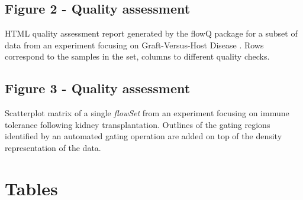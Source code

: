 \documentclass[10pt]{bmc_article}
\newcommand{\Rclass}[1]{{\textit{#1}}}
\newenvironment{bmcformat}{\begin{raggedright}\baselineskip20pt\sloppy\setboolean{publ}{false}}{\end{raggedright}\baselineskip20pt\sloppy}
\begin{document}
\begin{bmcformat}
  
  \subsection*{Figure 2 - Quality assessment}
    \label{flowQ}%
        HTML quality assessment report generated by the flowQ package for a
        subset of data from an experiment focusing on Graft-Versus-Host
        Disease \cite{brinkman2007hcf}. Rows correspond to the samples in
        the set, columns to different quality checks.


    \subsection*{Figure 3 - Quality assessment}
    \label{xyplot}{
        Scatterplot matrix of a single \Rclass{flowSet} from an experiment
        focusing on immune tolerance following kidney
        transplantation. Outlines of the gating regions identified by an
        automated gating operation are added on top of the density
        representation of the data.}


\section*{Tables}

\end{bmcformat}
\end{document}
